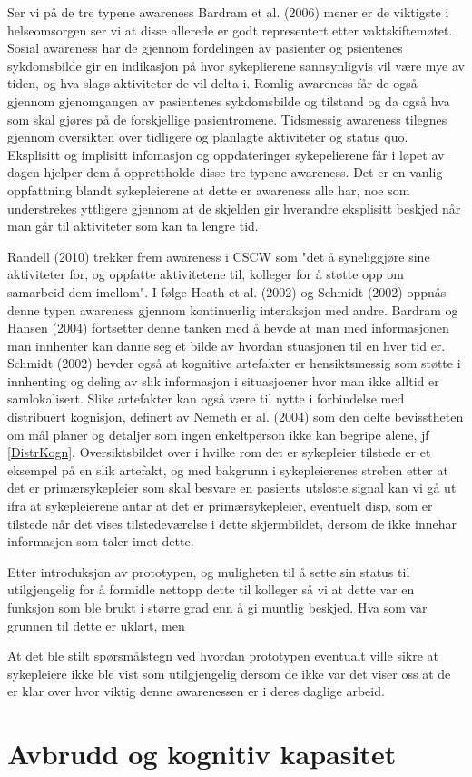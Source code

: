 \noindent
Ser vi på de tre typene awareness Bardram et al. (2006) mener er de viktigste i helseomsorgen ser vi at disse allerede er godt representert etter vaktskiftemøtet. Sosial awareness har de gjennom fordelingen av pasienter og psientenes sykdomsbilde gir en indikasjon på hvor sykeplierene sannsynligvis vil være mye av tiden, og hva slags aktiviteter de vil delta i. Romlig awareness får de også gjennom gjenomgangen av pasientenes sykdomsbilde og tilstand og da også hva som skal gjøres på de forskjellige pasientromene. Tidsmessig awareness tilegnes gjennom oversikten over tidligere og planlagte aktiviteter og status quo. Eksplisitt og implisitt infomasjon og oppdateringer sykepelierene får i løpet av dagen hjelper dem å opprettholde disse tre typene awareness. Det er en vanlig oppfattning blandt sykepleierene at dette er awareness alle har, noe som understrekes yttligere gjennom at de skjelden gir hverandre eksplisitt beskjed når man går til aktiviteter som kan ta lengre tid. 

Randell (2010) trekker frem awareness i CSCW som "det å syneliggjøre sine aktiviteter for, og oppfatte aktivitetene til, kolleger for å støtte opp om samarbeid dem imellom". I følge Heath et al. (2002) og Schmidt (2002) oppnås denne typen awareness gjennom kontinuerlig interaksjon med andre. Bardram og Hansen (2004) fortsetter denne tanken med å hevde at man med informasjonen man innhenter kan danne seg et bilde av hvordan stuasjonen til en hver tid er.
Schmidt (2002) hevder også at kognitive artefakter er hensiktsmessig som støtte i innhenting og deling av slik informasjon i situasjoener hvor man ikke alltid er samlokalisert. Slike artefakter kan også være til nytte i forbindelse med distribuert kognisjon, definert av Nemeth er al. (2004) som den delte bevisstheten om mål planer og detaljer som ingen enkeltperson ikke kan begripe alene, jf \ref{DistrKogn}.
Oversiktsbildet over i hvilke rom det er sykepleier tilstede er et eksempel på en slik artefakt, og med bakgrunn i sykepleierenes streben etter at det er primærsykepleier som skal besvare en pasients utsløste signal kan vi gå ut ifra at sykepleierene antar at det er primærsykepleier, eventuelt disp, som er tilstede når det vises tilstedeværelse i dette skjermbildet, dersom de ikke innehar informasjon som taler imot dette.




\noindent
Etter introduksjon av prototypen, og muligheten til å sette sin status til utilgjengelig
for å formidle nettopp dette til kolleger så vi at dette var en funksjon som ble brukt
i større grad enn å gi muntlig beskjed. Hva som var grunnen til dette er uklart, men 

\noindent
At det ble stilt spørsmålstegn ved hvordan prototypen eventualt ville sikre at sykepleiere ikke ble vist som utilgjengelig dersom de ikke var det viser oss at de er klar over hvor viktig denne awarenessen er i deres daglige arbeid. 


\section{Avbrudd og kognitiv kapasitet}


